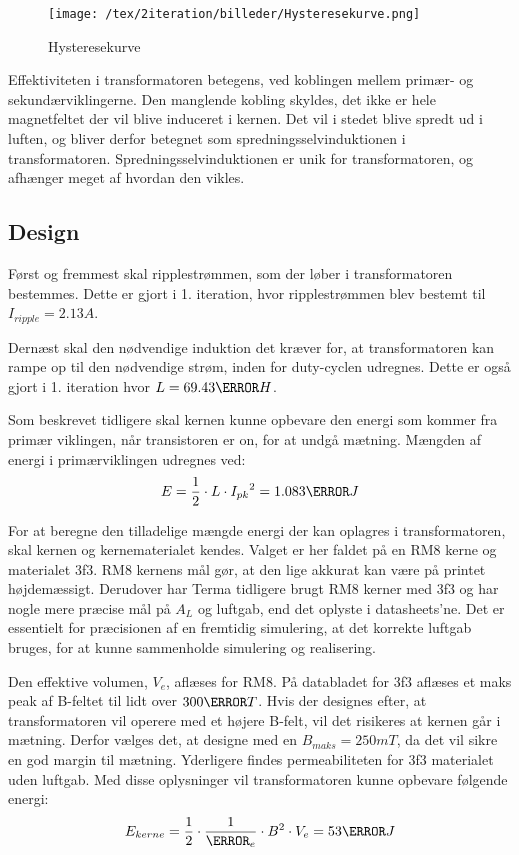 \begin{figure}[H]
	\center
	\texttt{[image: /tex/2iteration/billeder/Hysteresekurve.png]}
	\caption{Hysteresekurve}
	\label{fig: Hysteresekurve}
\end{figure}


Effektiviteten i transformatoren betegens, ved koblingen mellem primær- og sekundærviklingerne. Den manglende kobling skyldes, det ikke er hele magnetfeltet der vil blive induceret i kernen. Det vil i stedet blive spredt ud i luften, og bliver derfor betegnet som spredningsselvinduktionen i transformatoren. Spredningsselvinduktionen er unik for transformatoren, og afhænger meget af hvordan den vikles. 


\subsection{Design}
Først og fremmest skal ripplestrømmen, som der løber i transformatoren bestemmes. Dette er gjort i 1. iteration, hvor ripplestrømmen blev bestemt til $I_{ripple} = 2.13A$.

Dernæst skal den nødvendige induktion det kræver for, at transformatoren kan rampe op til den nødvendige strøm, inden for duty-cyclen udregnes. Dette er også gjort i 1. iteration hvor $L=69.43\micro H$.

Som beskrevet tidligere skal kernen kunne opbevare den energi som kommer fra primær viklingen, når transistoren er on, for at undgå mætning. Mængden af energi i primærviklingen udregnes ved:
\begin{equation} \label{Primary_energy}
E = \frac{1} {2} \cdot L \cdot {I_{pk}}^2 = 1.083\milli J
\end{equation}

For at beregne den tilladelige mængde energi der kan oplagres i transformatoren, skal kernen og kernematerialet kendes. Valget er her faldet på en RM8 kerne\cite{RM8} og materialet 3f3\cite{3f3}. RM8 kernens mål gør, at den lige akkurat kan være på printet højdemæssigt. Derudover har Terma tidligere brugt RM8 kerner med 3f3 og har nogle mere præcise mål på $A_L$ og luftgab, end det oplyste i datasheets’ne. Det er essentielt for præcisionen af en fremtidig simulering, at det korrekte luftgab bruges, for at kunne sammenholde simulering og realisering.


Den effektive volumen, $V_e$, aflæses for RM8. På databladet for 3f3 aflæses et maks peak af B-feltet til lidt over $300\milli T$. Hvis der designes efter, at transformatoren vil operere med et højere B-felt, vil det risikeres at kernen går i mætning. Derfor vælges det, at designe med en $B_{maks}=250mT$, da det vil sikre en god margin til mætning. Yderligere findes permeabiliteten for 3f3 materialet uden luftgab. Med disse oplysninger vil transformatoren kunne opbevare følgende energi:
\begin{equation} \label{Energy_no_gap}
E_{kerne} = \frac{1} {2} \cdot \frac{1}{\micro_e} \cdot B^2 \cdot V_e = 53\pico J
\end{equation}

